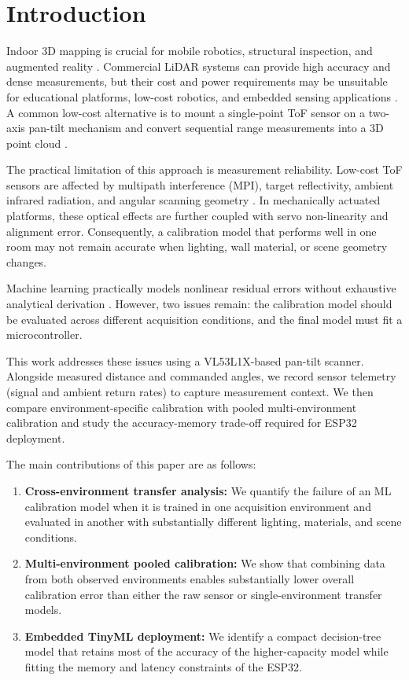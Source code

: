\documentclass[conference, a4paper]{IEEEtran}
\begin{document}
\section{Introduction}
Indoor 3D mapping is crucial for mobile robotics, structural inspection, and augmented reality \cite{hess2016real, rusu20113d}. Commercial LiDAR systems can provide high accuracy and dense measurements, but their cost and power requirements may be unsuitable for educational platforms, low-cost robotics, and embedded sensing applications \cite{amann2001laser, behroozpour2017lidar}. A common low-cost alternative is to mount a single-point ToF sensor on a two-axis pan-tilt mechanism and convert sequential range measurements into a 3D point cloud \cite{willis2009design}.

The practical limitation of this approach is measurement reliability. Low-cost ToF sensors are affected by multipath interference (MPI), target reflectivity, ambient infrared radiation, and angular scanning geometry \cite{corti2016metrological, lindner2010time}. In mechanically actuated platforms, these optical effects are further coupled with servo non-linearity and alignment error. Consequently, a calibration model that performs well in one room may not remain accurate when lighting, wall material, or scene geometry changes.

Machine learning practically models nonlinear residual errors without exhaustive analytical derivation \cite{he2017depth}. However, two issues remain: the calibration model should be evaluated across different acquisition conditions, and the final model must fit a microcontroller.

This work addresses these issues using a VL53L1X-based pan-tilt scanner. Alongside measured distance and commanded angles, we record sensor telemetry (signal and ambient return rates) to capture measurement context. We then compare environment-specific calibration with pooled multi-environment calibration and study the accuracy-memory trade-off required for ESP32 deployment.

The main contributions of this paper are as follows:

\begin{enumerate}
\item \textbf{Cross-environment transfer analysis:} We quantify the failure of an ML calibration model when it is trained in one acquisition environment and evaluated in another with substantially different lighting, materials, and scene conditions.
\item \textbf{Multi-environment pooled calibration:} We show that combining data from both observed environments enables substantially lower overall calibration error than either the raw sensor or single-environment transfer models.
\item \textbf{Embedded TinyML deployment:} We identify a compact decision-tree model that retains most of the accuracy of the higher-capacity model while fitting the memory and latency constraints of the ESP32.
\end{enumerate}
\end{document}
